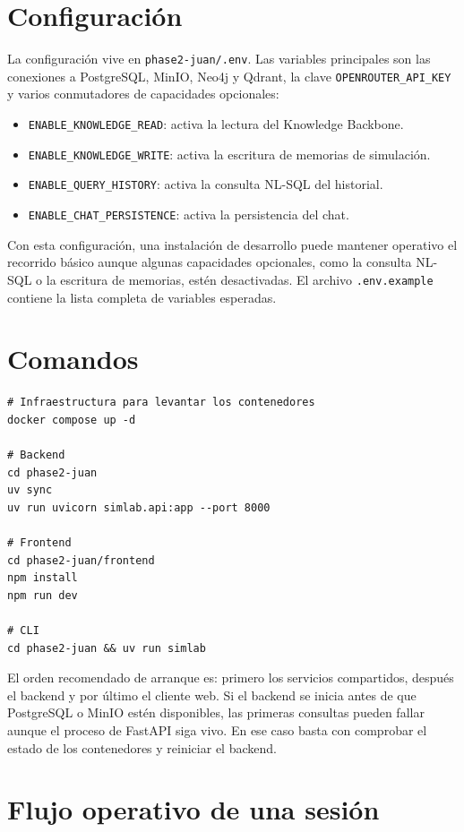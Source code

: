 \section{Configuración}

La configuración vive en \texttt{phase2-juan/.env}. Las variables principales
son las conexiones a PostgreSQL, MinIO, Neo4j y Qdrant, la clave
\texttt{OPENROUTER\_API\_KEY} y varios conmutadores de capacidades opcionales:

\begin{itemize}
\item \texttt{ENABLE\_KNOWLEDGE\_READ}: activa la lectura del Knowledge Backbone.
\item \texttt{ENABLE\_KNOWLEDGE\_WRITE}: activa la escritura de memorias de simulación.
\item \texttt{ENABLE\_QUERY\_HISTORY}: activa la consulta NL-SQL del historial.
\item \texttt{ENABLE\_CHAT\_PERSISTENCE}: activa la persistencia del chat.
\end{itemize}

Con esta configuración, una instalación de desarrollo puede mantener operativo
el recorrido básico aunque algunas capacidades opcionales, como la consulta
NL-SQL o la escritura de memorias, estén desactivadas. El archivo
\texttt{.env.example} contiene la lista completa de variables esperadas.

\section{Comandos}

\begin{verbatim}
# Infraestructura para levantar los contenedores
docker compose up -d

# Backend
cd phase2-juan
uv sync
uv run uvicorn simlab.api:app --port 8000

# Frontend
cd phase2-juan/frontend
npm install
npm run dev

# CLI
cd phase2-juan && uv run simlab
\end{verbatim}

El orden recomendado de arranque es: primero los servicios compartidos,
después el backend y por último el cliente web. Si el backend se inicia antes
de que PostgreSQL o MinIO estén disponibles, las primeras consultas pueden
fallar aunque el proceso de FastAPI siga vivo. En ese caso basta con comprobar
el estado de los contenedores y reiniciar el backend.

\section{Flujo operativo de una sesión}

